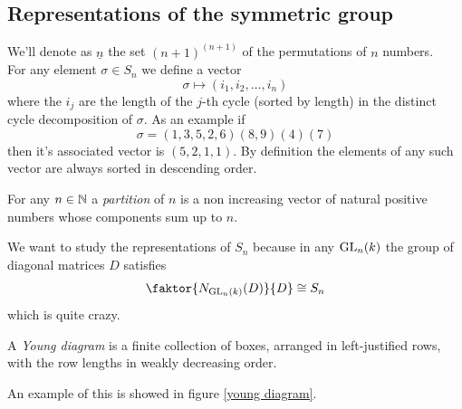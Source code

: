 \documentclass[11pt]{scrartcl}
\begin{document}
	\subsection{Representations of the symmetric group}
	We'll denote as $\underline{n}$ the set $(n+1)^{(n+1)}$ of the permutations of $n$ numbers. \\
	For any element $\sigma\in S_n$ we define a vector 
	$$\sigma \mapsto (i_1,i_2,\dots,i_n)$$
	where the $i_j$ are the length of the $j$-th cycle (sorted by length) in the distinct cycle decomposition of $\sigma$. As an example if 
	$$\sigma=(1,3,5,2,6)(8,9)(4)(7)$$
	then it's associated vector is $(5,2,1,1)$. By definition the elements of any such vector are always sorted in descending order.
	\begin{definition}[Partition]
		For any $n\in\mathbb N$ a \textit{partition} of $n$ is a non increasing vector of natural positive numbers whose components sum up to $n$.
	\end{definition}
	We want to study the representations of $S_n$ because in any $\operatorname{GL}_n(k)$ the group of diagonal matrices $D$ satisfies
	$$\faktor{N_{\GL_n(k)}(D)}{D}\cong S_n$$
	which is quite crazy.
	\begin{definition}
		A \textit{Young diagram} is a finite collection of boxes, arranged in left-justified rows, with the row lengths in weakly decreasing order.
	\end{definition}
	An example of this is showed in figure \ref{young diagram}.
\end{document}

